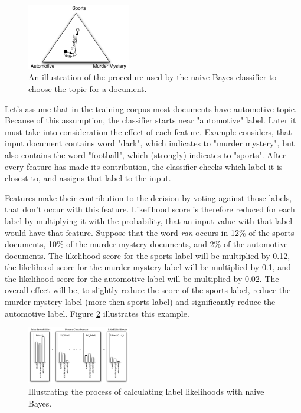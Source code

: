 \documentclass[10pt, conference, compsocconf]{IEEEtran}
\begin{document}
\begin{figure}[htb]
\begin{center}
\includegraphics[width=0.4\textwidth]{naive-bayes-triangle.png} 
\end{center}
\caption{An illustration of the procedure used by the naive Bayes classifier to choose the topic for a document.}
\label{fig:naive-bayes-triangle}
\end{figure}

Let's assume that in the training corpus most documents have automotive topic. Because of this assumption, the classifier starts near "automotive" label. Later it must take into consideration the effect of each feature. Example considers, that input document contains word "dark", which indicates to "murder mystery", but also contains the word "football", which (strongly) indicates to "sports". After every feature has made its contribution, the classifier checks which label it is closest to, and assigns that label to the input.

Features make their contribution to the decision by voting against those labels, that don't occur with this feature. Likelihood score is therefore reduced for each label by multiplying it with the probability, that an input value with that label would have that feature. Suppose that the word \textit{ran} occurs in  12\% of the sports documents, 10\% of the murder mystery documents, and 2\% of the automotive documents. The likelihood score for the sports label will be multiplied by 0.12, the likelihood score for the murder mystery label will be multiplied by 0.1, and the likelihood score for the automotive label will be multiplied by 0.02. The overall effect will be, to slightly reduce the score of the sports label, reduce the murder mystery label (more then sports label) and significantly reduce the automotive label. Figure \ref{fig:naive-bayes-bargraph} illustrates this example.

\begin{figure}[htb]
\begin{center}
\includegraphics[width=0.4\textwidth]{naive_bayes_bargraph.png} 
\end{center}
\caption{Illustrating the process of calculating label likelihoods with naive Bayes.}
\label{fig:naive-bayes-bargraph}
\end{figure}
\end{document}

